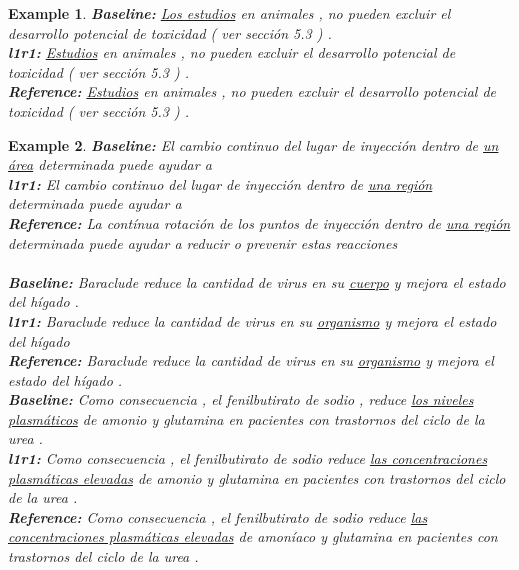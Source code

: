\documentclass[smallextended]{svjour3}       %
\theoremstyle{break}
\newtheorem{exmp}{Example}[section]
\begin{document}
\begin{exmp}
\footnotesize
\label{ex:QAdrop}
\textbf{Baseline:} \underline{Los estudios} en animales , no pueden excluir el desarrollo potencial de toxicidad ( ver sección 5.3 ) . \\
\textbf{l1r1:} \underline{Estudios} en animales , no pueden excluir el desarrollo potencial de toxicidad ( ver sección 5.3 ) . \\
\textbf{Reference:} \underline{Estudios} en animales , no pueden excluir el desarrollo potencial de toxicidad ( ver sección 5.3 ) .
\end{exmp}


\begin{exmp}
\footnotesize
\label{ex:QAsynonym}
\textbf{Baseline:} El cambio continuo del lugar de inyección dentro de \underline{un área} determinada puede ayudar a \\
\textbf{l1r1:} El cambio continuo del lugar de inyección dentro de \underline{una región} determinada puede ayudar a \\
\textbf{Reference:} La contínua rotación de los puntos de inyección dentro de \underline{una región} determinada puede ayudar a reducir o prevenir estas reacciones \\ \\
\textbf{Baseline:} Baraclude reduce la cantidad de virus en su \underline{cuerpo} y mejora el estado del hígado . \\
\textbf{l1r1:} Baraclude reduce la cantidad de virus en su \underline{organismo} y mejora el estado del hígado  \\
\textbf{Reference:} Baraclude reduce la cantidad de virus en su \underline{organismo} y mejora el estado del hígado .
\\
\textbf{Baseline:} Como consecuencia , el fenilbutirato de sodio , reduce \underline{los niveles plasmáticos} de amonio y glutamina en pacientes con trastornos del ciclo de la urea . \\
\textbf{l1r1:} Como consecuencia , el fenilbutirato de sodio reduce \underline{las concentraciones plasmáticas elevadas} de amonio y glutamina en pacientes con trastornos del ciclo de la urea .  \\
\textbf{Reference:} Como consecuencia , el fenilbutirato de sodio reduce \underline{las concentraciones plasmáticas elevadas} de amoníaco y glutamina en pacientes con trastornos del ciclo de la urea .
\end{exmp}
\end{document}
